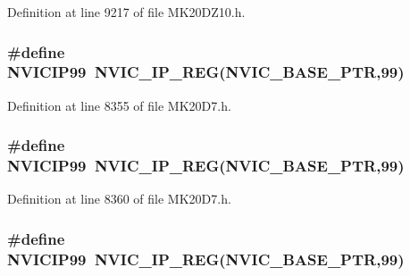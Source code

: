Definition at line 9217 of file M\+K20\+D\+Z10.\+h.

\subsubsection[{\texorpdfstring{N\+V\+I\+C\+I\+P99}{NVICIP99}}]{\setlength{\rightskip}{0pt plus 5cm}\#define N\+V\+I\+C\+I\+P99~{\bf N\+V\+I\+C\+\_\+\+I\+P\+\_\+\+R\+EG}({\bf N\+V\+I\+C\+\_\+\+B\+A\+S\+E\+\_\+\+P\+TR},99)}\hypertarget{group___n_v_i_c___register___accessor___macros_ga78b40866875d3a0ab41d884222893340}{}\label{group___n_v_i_c___register___accessor___macros_ga78b40866875d3a0ab41d884222893340}


Definition at line 8355 of file M\+K20\+D7.\+h.

\subsubsection[{\texorpdfstring{N\+V\+I\+C\+I\+P99}{NVICIP99}}]{\setlength{\rightskip}{0pt plus 5cm}\#define N\+V\+I\+C\+I\+P99~{\bf N\+V\+I\+C\+\_\+\+I\+P\+\_\+\+R\+EG}({\bf N\+V\+I\+C\+\_\+\+B\+A\+S\+E\+\_\+\+P\+TR},99)}\hypertarget{group___n_v_i_c___register___accessor___macros_ga78b40866875d3a0ab41d884222893340}{}\label{group___n_v_i_c___register___accessor___macros_ga78b40866875d3a0ab41d884222893340}


Definition at line 8360 of file M\+K20\+D7.\+h.

\subsubsection[{\texorpdfstring{N\+V\+I\+C\+I\+P99}{NVICIP99}}]{\setlength{\rightskip}{0pt plus 5cm}\#define N\+V\+I\+C\+I\+P99~{\bf N\+V\+I\+C\+\_\+\+I\+P\+\_\+\+R\+EG}({\bf N\+V\+I\+C\+\_\+\+B\+A\+S\+E\+\_\+\+P\+TR},99)}\hypertarget{group___n_v_i_c___register___accessor___macros_ga78b40866875d3a0ab41d884222893340}{}\label{group___n_v_i_c___register___accessor___macros_ga78b40866875d3a0ab41d884222893340}


